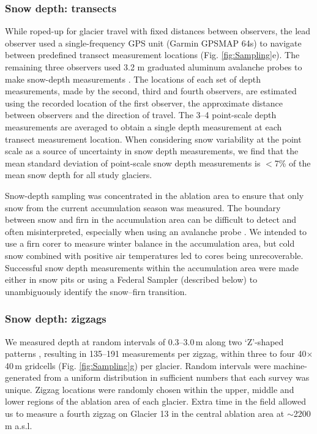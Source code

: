 \documentclass[review,oneside, letterpaper]{igs}
\begin{document}
\subsubsection{Snow depth: transects}

While roped-up for glacier travel with fixed distances between observers, the lead observer used a single-frequency GPS unit (Garmin GPSMAP 64s) to navigate between predefined transect measurement locations (Fig. \ref{fig:Sampling}e). The remaining three observers used 3.2 m graduated aluminum avalanche probes to make snow-depth measurements \citep{Kinar2015}. The locations of each set of depth measurements, made by the second, third and fourth observers, are estimated using the recorded location of the first observer, the approximate distance between observers and the direction of travel. The 3--4 point-scale depth measurements are averaged to obtain a single depth measurement at each transect measurement location. When considering snow variability at the point scale as a source of uncertainty in snow depth measurements, we find that the mean standard deviation of point-scale snow depth measurements is $<$7\% of the mean snow depth for all study glaciers.

Snow-depth sampling was concentrated in the ablation area to ensure that only snow from the current accumulation season was measured. The boundary between snow and firn in the accumulation area can be difficult to detect and often misinterpreted, especially when using an avalanche probe \citep{Grunewald2010,Sold2013}. We intended to use a firn corer to measure winter balance in the accumulation area, but cold snow combined with positive air temperatures led to cores being unrecoverable. Successful snow depth measurements within the accumulation area were made either in snow pits or using a Federal Sampler (described below) to unambiguously identify the snow--firn transition. 

\subsubsection{Snow depth: zigzags}

We measured depth at random intervals of 0.3--3.0\,m along two `Z'-shaped patterns \citep{Shea2010}, resulting in 135--191 measurements per zigzag, within three to four 40$\times$40\,m gridcells (Fig. \ref{fig:Sampling}g) per glacier. Random intervals were machine-generated from a uniform distribution in sufficient numbers that each survey was unique. Zigzag locations were randomly chosen within the upper, middle and lower regions of the ablation area of each glacier. Extra time in the field allowed us to measure a fourth zigzag on Glacier 13 in the central ablation area at $\sim$2200 m a.s.l. 
\end{document}
